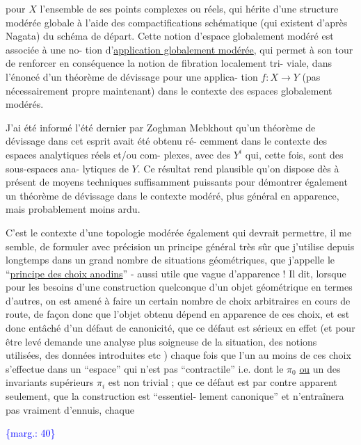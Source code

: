 \documentclass[11pt]{article}
\newcommand{\scanpage}[1]{\par\bigskip\noindent{\small\sffamily[scan #1]}\par}
\newcommand{\mspage}[1]{{\small\sffamily[p.\,#1]}}
\newcommand{\margin}[1]{\textcolor{blue}{\{\textsf{marg.:} #1\}}}
\newcommand{\uline}[1]{\underline{#1}}
\begin{document}
pour  $X$  l'ensemble de ses points complexes ou réels, qui hérite
d'une structure modérée globale à l'aide des compactifications
schématique (qui existent d'après Nagata) du schéma de départ.
Cette notion d'espace globalement modéré est associée à une no-%
tion d'\uline{application globalement modérée}, qui permet à son tour de
renforcer en conséquence la notion de fibration localement tri-%
viale, dans l'énoncé d'un théorème de dévissage pour une applica-%
tion  $f : X \longrightarrow Y$  (pas nécessairement propre maintenant) dans
le contexte des espaces globalement modérés.

J'ai été informé l'été dernier par Zoghman Mebkhout
qu'un théorème de dévissage dans cet esprit avait été obtenu ré-%
cemment dans le contexte des espaces analytiques réels et/ou com-%
plexes, avec des  $Y^{i}$  qui, cette fois, sont des sous-espaces ana-%
lytiques de  $Y$. Ce résultat rend plausible qu'on dispose dès à
présent de moyens techniques suffisamment puissants pour démontrer
également un théorème de dévissage dans le contexte modéré, plus
général en apparence, mais probablement moins ardu.

C'est le contexte d'une topologie modérée également
qui devrait permettre, il me semble, de formuler avec précision
un principe général très sûr que j'utilise depuis longtemps dans
un grand nombre de situations géométriques, que j'appelle le
``\uline{principe des choix anodins}'' - aussi utile que vague d'apparence !
Il dit, lorsque pour les besoins d'une construction quelconque
d'un objet géométrique en termes d'autres, on est amené à faire
un certain nombre de choix arbitraires en cours de route, de façon
donc que l'objet obtenu dépend en apparence de ces choix, et est
donc entâché d'un défaut de canonicité, que ce défaut est sérieux
en effet (et pour être levé demande une analyse plus soigneuse de
la situation, des notions utilisées, des données introduites etc )
chaque fois que l'un au moins de ces choix s'effectue dans un
``espace'' qui n'est pas ``contractile'' i.e. dont le  $\pi_{0}$  \uline{ou} un des
invariants supérieurs  $\pi_{i}$  est non trivial ; que ce défaut est
par contre apparent seulement, que la construction est ``essentiel-%
lement canonique'' et n'entraînera pas vraiment d'ennuis, chaque

\margin{40}

\clearpage
\scanpage{119/41}
\mspage{39}
\end{document}
